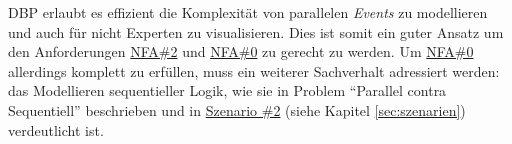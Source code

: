 \ac{DBP} erlaubt es effizient die Komplexität von parallelen \textit{Events} zu modellieren und auch für nicht Experten zu visualisieren. Dies ist somit ein guter Ansatz um den Anforderungen \hyperref[tab:NFA2]{NFA\#2} und \hyperref[tab:NFA0]{NFA\#0} zu gerecht zu werden. Um \hyperref[tab:NFA0]{NFA\#0} allerdings komplett zu erfüllen, muss ein weiterer Sachverhalt adressiert werden: das Modellieren sequentieller Logik, wie sie in Problem "`Parallel contra Sequentiell"' beschrieben und in  \hyperref[szenario2]{Szenario \#2} (siehe Kapitel \ref{sec:szenarien}) verdeutlicht ist.